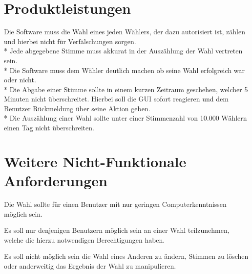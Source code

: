 \documentclass[parskip=full,11pt,twoside]{scrartcl}
\begin{document}
\section{Produktleistungen}
Die Software muss die Wahl eines jeden Wählers, der dazu autorisiert ist, zählen und hierbei nicht für Verfälschungen sorgen. \\*
Jede abgegebene Stimme muss akkurat in der Auszählung der Wahl vertreten sein. \\*
Die Software muss dem Wähler deutlich machen ob seine Wahl erfolgreich war oder nicht. \\*
Die Abgabe einer Stimme sollte in einem kurzen Zeitraum geschehen, welcher 5 Minuten nicht überschreitet.
Hierbei soll die GUI sofort reagieren und dem Benutzer Rückmeldung über seine Aktion geben. \\*
Die Auszählung einer Wahl sollte unter einer Stimmenzahl von 10.000 Wählern einen Tag nicht überschreiten. 


\section{Weitere Nicht-Funktionale Anforderungen}

Die Wahl sollte für einen Benutzer mit nur geringen Computerkenntnissen möglich sein.

Es soll nur denjenigen Benutzern möglich sein an einer Wahl teilzunehmen, welche die hierzu notwendigen Berechtigungen haben.

Es soll nicht möglich sein die Wahl eines Anderen zu ändern, Stimmen zu löschen oder anderweitig das Ergebnis der Wahl zu manipulieren.
\end{document}
